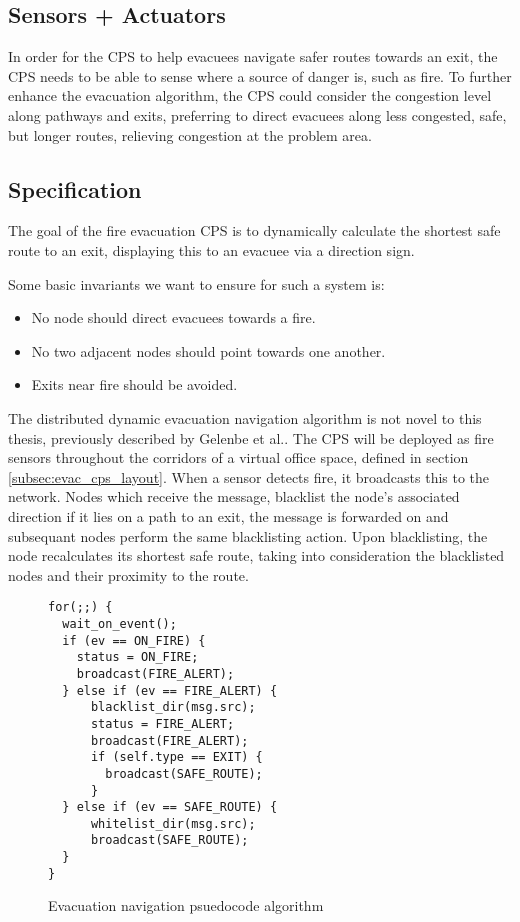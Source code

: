 \subsection{Sensors + Actuators}
\label{subsec:Sensors + Actuators}
In order for the CPS to help evacuees navigate safer routes towards an exit, the CPS needs to be able to sense where a source of danger is, such as fire. To further enhance the evacuation algorithm, the CPS could consider the congestion level along pathways and exits, preferring to direct evacuees along less congested, safe, but longer routes, relieving congestion at the problem area. 


\subsection{Specification} %
\label{sub:specification}
The goal of the fire evacuation CPS is to dynamically calculate the shortest safe route to an exit, displaying this to an evacuee via a direction sign.

Some basic invariants we want to ensure for such a system is:
\begin{itemize}
  \item No node should direct evacuees towards a fire.
  \item No two adjacent nodes should point towards one another.
  \item Exits near fire should be avoided.
\end{itemize}
The distributed dynamic evacuation navigation algorithm is not novel to this thesis, previously described by Gelenbe et al.\cite{6815220}.
The CPS will be deployed as fire sensors throughout the corridors of a virtual office space, defined in section \ref{subsec:evac_cps_layout}.
When a sensor detects fire, it broadcasts this to the network. Nodes which receive the message, blacklist the node's associated direction if it lies on a path to an exit, the message is forwarded on and subsequant nodes perform the same blacklisting action. Upon blacklisting, the node recalculates its shortest safe route, taking into consideration the blacklisted nodes and their proximity to the route.



\begin{figure}[h]
\begin{verbatim}
for(;;) {
  wait_on_event();
  if (ev == ON_FIRE) {
    status = ON_FIRE;
    broadcast(FIRE_ALERT);
  } else if (ev == FIRE_ALERT) {
      blacklist_dir(msg.src);
      status = FIRE_ALERT;
      broadcast(FIRE_ALERT);
      if (self.type == EXIT) {
        broadcast(SAFE_ROUTE);
      }
  } else if (ev == SAFE_ROUTE) {
      whitelist_dir(msg.src);
      broadcast(SAFE_ROUTE);
  }
}
\end{verbatim}
\caption{Evacuation navigation psuedocode algorithm}
\end{figure}
